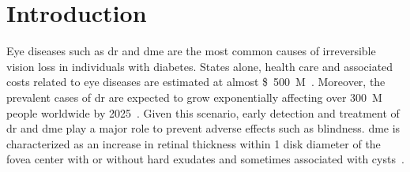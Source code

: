 
\graphicspath{ {./content/intro/figures/} }

\section{Introduction}

Eye diseases such as \ac{dr} and \ac{dme} are the most common causes of irreversible vision loss in individuals with diabetes.
States alone, health care and associated costs related to eye diseases are estimated at almost \SI{500}[\$]{M}~\cite{Sharma2005}.
Moreover, the prevalent cases of \ac{dr} are expected to grow exponentially affecting over \SI{300}{M} people worldwide by 2025~\cite{Wild2004}.
Given this scenario, early detection and treatment of \ac{dr} and \ac{dme} play a major role to prevent adverse effects such as blindness.
\ac{dme} is characterized as an increase in retinal thickness within 1 disk diameter of the fovea center with or without hard exudates and sometimes associated with cysts~\cite{ETDRSG1985}.

